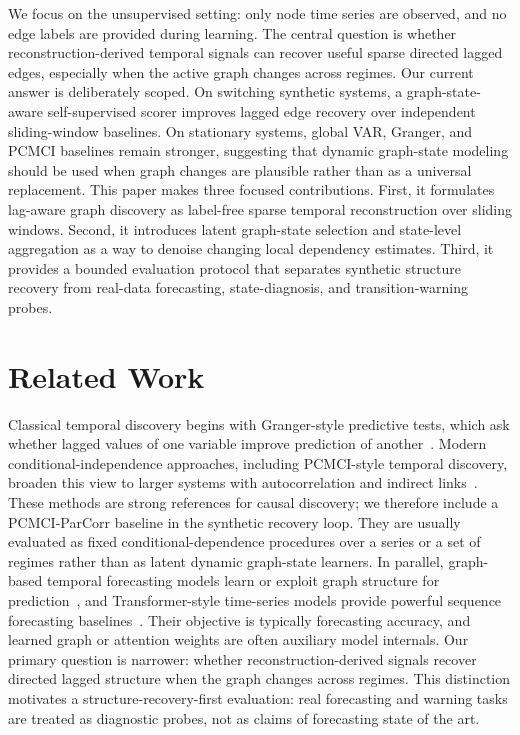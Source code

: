 \documentclass[sigconf,review,anonymous]{acmart}
\begin{document}
We focus on the unsupervised setting: only node time series are observed, and no edge labels are provided during learning.
The central question is whether reconstruction-derived temporal signals can recover useful sparse directed lagged edges, especially when the active graph changes across regimes.
Our current answer is deliberately scoped.
On switching synthetic systems, a graph-state-aware self-supervised scorer improves lagged edge recovery over independent sliding-window baselines.
On stationary systems, global VAR, Granger, and PCMCI baselines remain stronger, suggesting that dynamic graph-state modeling should be used when graph changes are plausible rather than as a universal replacement.
This paper makes three focused contributions.
First, it formulates lag-aware graph discovery as label-free sparse temporal reconstruction over sliding windows.
Second, it introduces latent graph-state selection and state-level aggregation as a way to denoise changing local dependency estimates.
Third, it provides a bounded evaluation protocol that separates synthetic structure recovery from real-data forecasting, state-diagnosis, and transition-warning probes.

\section{Related Work}

Classical temporal discovery begins with Granger-style predictive tests, which ask whether lagged values of one variable improve prediction of another~\cite{granger1969investigating}.
Modern conditional-independence approaches, including PCMCI-style temporal discovery, broaden this view to larger systems with autocorrelation and indirect links~\cite{runge2019detecting}.
These methods are strong references for causal discovery; we therefore include a PCMCI-ParCorr baseline in the synthetic recovery loop.
They are usually evaluated as fixed conditional-dependence procedures over a series or a set of regimes rather than as latent dynamic graph-state learners.
In parallel, graph-based temporal forecasting models learn or exploit graph structure for prediction~\cite{yu2018spatio,wu2020connecting}, and Transformer-style time-series models provide powerful sequence forecasting baselines~\cite{zhou2021informer}.
Their objective is typically forecasting accuracy, and learned graph or attention weights are often auxiliary model internals.
Our primary question is narrower: whether reconstruction-derived signals recover directed lagged structure when the graph changes across regimes.
This distinction motivates a structure-recovery-first evaluation: real forecasting and warning tasks are treated as diagnostic probes, not as claims of forecasting state of the art.
\end{document}

